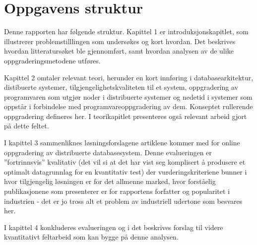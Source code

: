 \section{Oppgavens struktur}

Denne rapporten har følgende struktur. Kapittel 1 er introduksjonskapitlet, som illustrerer problemstilllingen som undersøkes og kort hvordan. Det beskrives hvordan litteratursøket ble gjennomført, samt hvordan analysen av de ulike oppgraderingsmetodene utføres.

Kapittel 2 omtaler relevant teori, herunder en kort innføring i databasearkitektur, distibuerte systemer, tilgjengelighetskvaliteten til et system, oppgradering av programvaren som utgjør noder i distribuerte systemer og nedetid i systemer som oppstår i forbindelse med programvareoppgradering av dem. Konseptet rullerende oppgradering defineres her. I teorikapitlet presenteres også relevant arbeid gjort på dette feltet.

I kapittel 3 sammenliknes løsningsforslagene artiklene kommer med for online oppgradering av distribuerte databasesystem. Denne evalueringen er ''fortrinnsvis'' kvalitativ (det vil si at det har vist seg komplisert å produsere et optimalt datagrunnlag for en kvantitativ test) der vurderingskriteriene bunner i hvor tilgjengelig løsningen er for det allmenne marked, hvor forståelig publikasjonene som presenterer er for rapportens forfatter og popularitet i industrien - det er jo tross alt et problem av industriell udertone som besvares her.

I kapittel 4 konkluderes evalueringen og i det beskrives forslag til videre kvantitativt feltarbeid som kan bygge på denne analysen.
